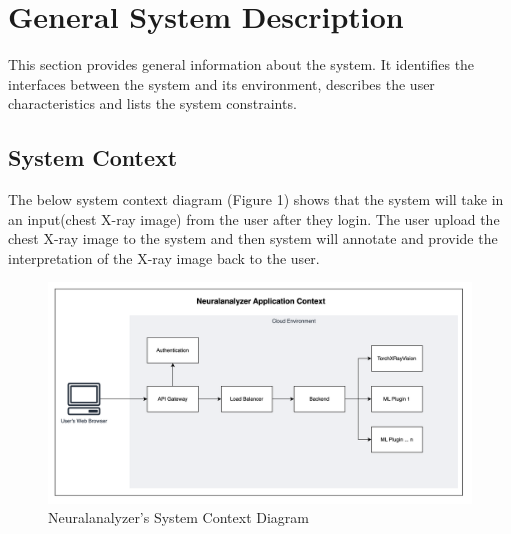 \documentclass[12pt]{article}
\begin{document}
\section{General System Description}

This section provides general information about the system.  It identifies the
interfaces between the system and its environment, describes the user
characteristics and lists the system constraints. \\

\subsection{System Context}
 
The below system context diagram (Figure 1) shows that the system will take in an input(chest X-ray image) from the user after they login. The user upload the chest X-ray image to the system and then system will annotate and provide the interpretation of the X-ray image back to the user.



\begin{figure}[h!]
  \centering
  \includegraphics[width=1\textwidth]{SystemContext.png}
  \caption{Neuralanalyzer's System Context Diagram}
  \label{fig:overall-infra}
\end{figure}
\end{document}
